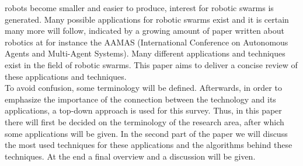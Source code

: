  robots become smaller and easier to produce, interest for robotic swarms is generated. Many possible applications for robotic swarms exist and it is certain many more will follow, indicated by a growing amount of paper written about robotics at for instance the AAMAS (International Conference on Autonomous Agents and Multi-Agent Systems). \cite{Amigoni2014} Many different applications and techniques exist in the field of robotic swarms. This paper aims to deliver a concise review of these applications and techniques. \\

To avoid confusion, some terminology will be defined. Afterwards, in order to emphasize the importance of the connection between the technology and its applications, a top-down approach is used for this survey. Thus, in this paper there will first be decided on the terminology of the research area, after which some applications will be given. In the second part of the paper we will discuss the most used techniques for these applications and the algorithms behind these techniques. At the end a final overview and a discussion will be given.\\
